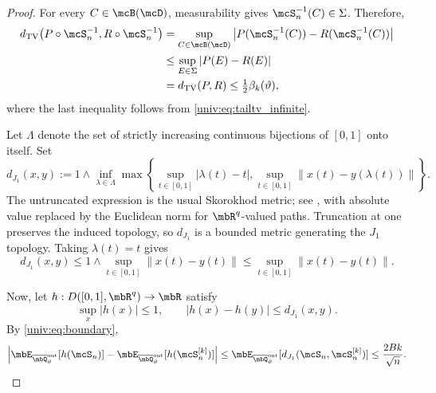 \documentclass[a4paper]{article}
\numberwithin{equation}{section}   %
\theoremstyle{plain}   %
\theoremstyle{plain}   %
\theoremstyle{examplestyle}
\newcommand{\TV}{d_{\mathrm{TV}}}
\newcommand{\unorm}[1]{\left\lVert#1\right\rVert}
\begin{document}
\begin{proof}
    For every $C\in\mcB(\mcD)$, measurability gives $\mcS_n^{-1}(C)\in\Sigma$. 
    Therefore,
    \[
        \begin{aligned}
            \TV\!\left(
                P\circ\mcS_n^{-1},
                R\circ\mcS_n^{-1}
            \right)
            &=
            \sup_{C\in\mcB(\mcD)}
            \left|
                P(\mcS_n^{-1}(C))
                -R(\mcS_n^{-1}(C))
            \right|\\
            &\le
            \sup_{E\in\Sigma}|P(E)-R(E)|\\
            &=\TV(P,R)
            \le\tfrac12\beta_k(\vartheta),
        \end{aligned}
    \]
    where the last inequality follows from \eqref{univ:eq:tailtv_infinite}.

    Let $\Lambda$ denote the set of strictly increasing continuous bijections of $[0,1]$ onto itself. 
    Set
    \[
        d_{J_1}(x,y)
        :=
        1\wedge
        \inf_{\lambda\in\Lambda}
        \max\left\{
            \sup_{t\in[0,1]}|\lambda(t)-t|,
            \sup_{t\in[0,1]}\unorm{x(t)-y(\lambda(t))}
        \right\}.
    \]
    The untruncated expression is the usual Skorokhod  metric; see \cite[Section~12]{Billingsley_1999}, with absolute value replaced by the Euclidean norm for $\mbR^q$-valued paths. 
    Truncation at one preserves the induced topology, so $d_{J_1}$ is a bounded metric generating the $J_1$ topology.
    Taking $\lambda(t)=t$ gives
    \[
        d_{J_1}(x,y)
        \le
        1\wedge\sup_{t\in[0,1]}\unorm{x(t)-y(t)}
        \le
        \sup_{t\in[0,1]}\unorm{x(t)-y(t)}.
    \]

    Now, let $h:D([0,1],\mbR^q)\to\mbR$ satisfy
    \[
        \sup_x|h(x)|\le1,
        \qquad
        |h(x)-h(y)|\le d_{J_1}(x,y).
    \]
    By \eqref{univ:eq:boundary},
    \[
        \begin{aligned}
            \left|
                \mbE_{\overline\mbQ^{\mathrm{out}}_\vartheta}
                    [h(\mcS_n)]
                -
                \mbE_{\overline\mbQ^{\mathrm{out}}_\vartheta}
                    [h(\mcS_n^{[k]})]
            \right|
            \le
            \mbE_{\overline\mbQ^{\mathrm{out}}_\vartheta}
                [d_{J_1}(\mcS_n,\mcS_n^{[k]})]
            \le\frac{2Bk}{\sqrt n}.
        \end{aligned}
    \]


\end{proof}
\end{document}
